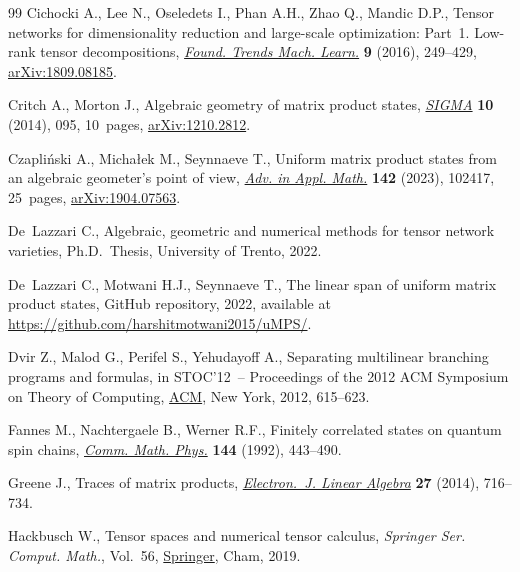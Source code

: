 \begin{thebibliography}{99}
Cichocki A., Lee N., Oseledets I., Phan A.H., Zhao Q., Mandic D.P., Tensor
  networks for dimensionality reduction and large-scale optimization: Part~1. Low-rank tensor decompositions, \href{http://doi.org/10.1561/2200000059}{\textit{Found. Trends Mach. Learn.}} \textbf{9} (2016), 249--429, \href{https://arxiv.org/abs/1809.08185}{arXiv:1809.08185}.

Critch A., Morton J., Algebraic geometry of matrix product states,
  \href{https://doi.org/10.3842/SIGMA.2014.095}{\textit{SIGMA}} \textbf{10} (2014), 095, 10~pages, \href{https://arxiv.org/abs/1210.2812}{arXiv:1210.2812}.

Czapli\'nski A., Micha{\l}ek M., Seynnaeve T., Uniform matrix product states
  from an algebraic geometer's point of view, \href{https://doi.org/10.1016/j.aam.2022.102417}{\textit{Adv. in Appl. Math.}}
  \textbf{142} (2023), 102417, 25~pages, \href{https://arxiv.org/abs/1904.07563}{arXiv:1904.07563}.

De~Lazzari C., Algebraic, geometric and numerical methods for tensor network
  varieties, Ph.D.~Thesis, {U}niversity of Trento, 2022.

De~Lazzari C., Motwani H.J., Seynnaeve T., The linear span of uniform matrix
  product states, {GitHub} repository, 2022, available at
  \url{https://github.com/harshitmotwani2015/uMPS/}.

Dvir Z., Malod G., Perifel S., Yehudayoff A., Separating multilinear branching
  programs and formulas, in S{TOC}'12~-- {P}roceedings of the 2012 {ACM}
  {S}ymposium on {T}heory of {C}omputing, \href{https://doi.org/10.1145/2213977.2214034}{ACM}, New York, 2012, 615--623.

Fannes M., Nachtergaele B., Werner R.F., Finitely correlated states on quantum
  spin chains, \href{https://doi.org/10.1007/BF02099178}{\textit{Comm. Math. Phys.}} \textbf{144} (1992), 443--490.

Greene J., Traces of matrix products, \href{https://doi.org/10.13001/1081-3810.1999}{\textit{Electron.~J. Linear Algebra}}
  \textbf{27} (2014), 716--734.

Hackbusch W., Tensor spaces and numerical tensor calculus, \textit{Springer
  Ser. Comput. Math.}, Vol.~56, \href{https://doi.org/10.1007/978-3-030-35554-8}{Springer}, Cham, 2019.


\end{thebibliography}

